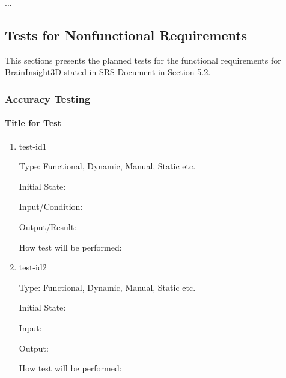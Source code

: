 \documentclass[12pt, titlepage]{article}
\begin{document}
...

\subsection{Tests for Nonfunctional Requirements}

This sections presents the planned tests for the functional requirements for BrainInsight3D stated in SRS Document
\cite{BrainInsightSRS2024} in Section 5.2.




\subsubsection{Accuracy Testing}

\paragraph{Title for Test}

\begin{enumerate}

  \item{test-id1\\}

        Type: Functional, Dynamic, Manual, Static etc.

        Initial State:

        Input/Condition:

        Output/Result:

        How test will be performed:

  \item{test-id2\\}

        Type: Functional, Dynamic, Manual, Static etc.

        Initial State:

        Input:

        Output:

        How test will be performed:

\end{enumerate}
\end{document}
